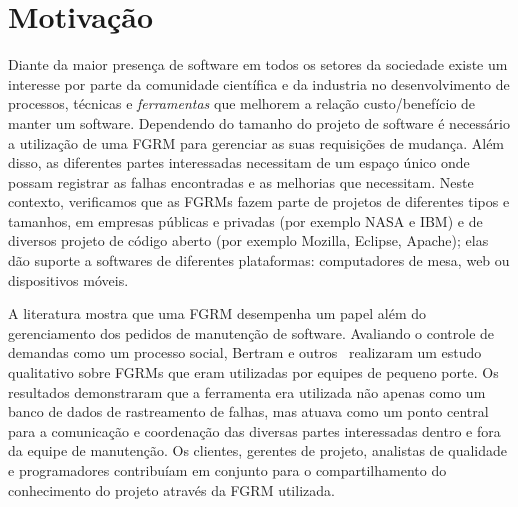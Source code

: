 \begin{table}[htpb]
\centering
{}
\caption{Exemplos de ferramentas e serviços da Internet que podem ser
    classificados como FGRMs. Extraído de~\cite{cavalcanti2014challenges}}
\label{tab:exemplo}
\end{table}

\section{Motivação}
\label{sec:intro-motivacao}

Diante da maior presença de software em todos os setores da sociedade existe um
interesse por parte da comunidade científica e da industria no desenvolvimento
de processos, técnicas e \textit{ferramentas} que melhorem a relação
custo/benefício de manter um software. Dependendo do tamanho do projeto de
software é necessário a utilização de uma FGRM para gerenciar as suas
requisições de mudança. Além disso, as diferentes partes interessadas
necessitam de um espaço único onde possam registrar as falhas encontradas e as
melhorias que necessitam. Neste contexto, verificamos que as FGRMs fazem parte
de projetos de diferentes tipos e tamanhos, em empresas públicas e privadas
(por exemplo NASA e IBM) e de diversos projeto de código aberto (por exemplo
Mozilla, Eclipse, Apache); elas dão suporte a softwares de diferentes
plataformas: computadores de mesa, web ou dispositivos móveis.

A literatura mostra que uma FGRM desempenha um papel além do gerenciamento dos
pedidos de manutenção de software. Avaliando o controle de demandas como um
processo social, Bertram e outros~\cite{Bertram:2010:CCB:1718918.1718972}
realizaram um estudo qualitativo sobre FGRMs que eram utilizadas por equipes de
pequeno porte. Os resultados demonstraram que a ferramenta era utilizada não
apenas como um banco de dados de rastreamento de falhas, mas atuava como um
ponto central para a comunicação e coordenação das diversas partes interessadas
dentro e fora da equipe de manutenção. Os clientes, gerentes de projeto,
analistas de qualidade e programadores contribuíam em conjunto para o
compartilhamento do conhecimento do projeto através da FGRM utilizada.

